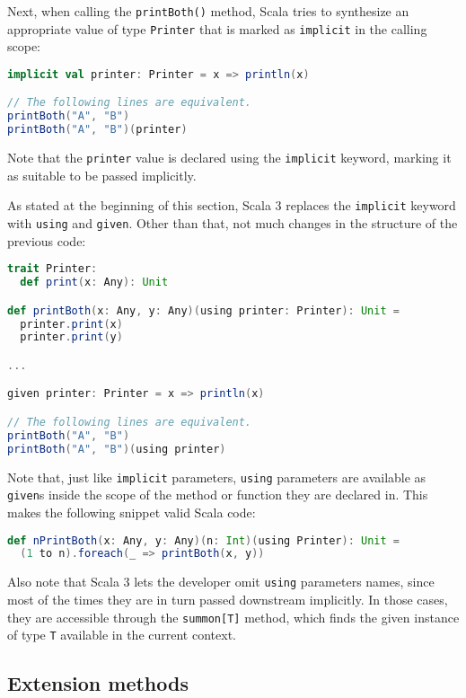 Next, when calling the \texttt{printBoth()} method, Scala tries to synthesize an appropriate value of type \texttt{Printer} that is marked as \texttt{implicit} in the calling scope:
%
\begin{lstlisting}[frame=single, language=scala]
implicit val printer: Printer = x => println(x)

// The following lines are equivalent.
printBoth("A", "B")
printBoth("A", "B")(printer)
\end{lstlisting}
%
Note that the \texttt{printer} value is declared using the \texttt{implicit} keyword, marking it as suitable to be passed implicitly.

As stated at the beginning of this section, Scala 3 replaces the \texttt{implicit} keyword with \texttt{using} and \texttt{given}.
%
Other than that, not much changes in the structure of the previous code:
%
\begin{lstlisting}[frame=single, language=scala]
trait Printer:
  def print(x: Any): Unit

def printBoth(x: Any, y: Any)(using printer: Printer): Unit =
  printer.print(x)
  printer.print(y)

...

given printer: Printer = x => println(x)

// The following lines are equivalent.
printBoth("A", "B")
printBoth("A", "B")(using printer)
\end{lstlisting}

Note that, just like \texttt{implicit} parameters, \texttt{using} parameters are available as \texttt{given}s inside the scope of the method or function they are declared in.
%
This makes the following snippet valid Scala code:
%
\begin{lstlisting}[frame=single, language=scala]
def nPrintBoth(x: Any, y: Any)(n: Int)(using Printer): Unit =
  (1 to n).foreach(_ => printBoth(x, y))
\end{lstlisting}
%
Also note that Scala 3 lets the developer omit \texttt{using} parameters names, since most of the times they are in turn passed downstream implicitly.
%
In those cases, they are accessible through the \texttt{summon[T]} method, which finds the given instance of type \texttt{T} available in the current context.

\subsection{Extension methods}
\label{sec:extension-methods}

